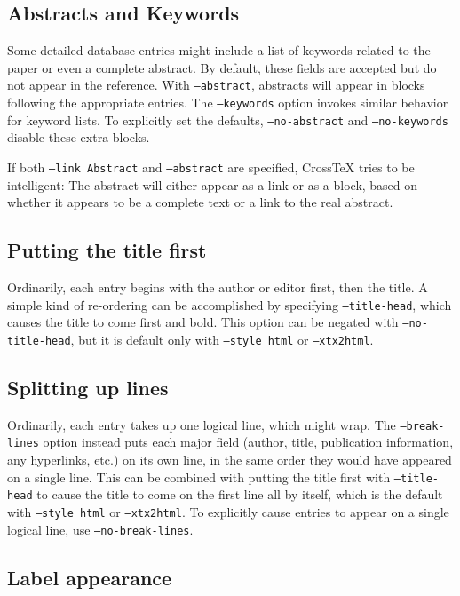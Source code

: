 \documentclass{article}
\newcommand{\XTX}{Cross\TeX}
\begin{document}
\subsection{Abstracts and Keywords}

Some detailed database entries might include a list of keywords related
to the paper or even a complete abstract.  By default, these fields are
accepted but do not appear in the reference.  With \texttt{--abstract},
abstracts will appear in blocks following the appropriate entries.
The \texttt{--keywords} option invokes similar behavior for keyword
lists.  To explicitly set the defaults, \texttt{--no-abstract} and
\texttt{--no-keywords} disable these extra blocks.

If both \texttt{--link~Abstract} and \texttt{--abstract} are specified,
\XTX{} tries to be intelligent: The abstract will either appear as a
link or as a block, based on whether it appears to be a complete text
or a link to the real abstract.

\subsection{Putting the title first}

Ordinarily, each entry begins with the author or editor first, then the
title.  A simple kind of re-ordering can be accomplished by specifying
\texttt{--title-head}, which causes the title to come first and bold.
This option can be negated with \texttt{--no-title-head}, but it is
default only with \texttt{--style~html} or \texttt{--xtx2html}.

\subsection{Splitting up lines}

Ordinarily, each entry takes up one logical line, which might wrap.
The \texttt{--break-lines} option instead puts each major field (author,
title, publication information, any hyperlinks, etc.) on its own line,
in the same order they would have appeared on a single line.  This can be
combined with putting the title first with \texttt{--title-head} to cause
the title to come on the first line all by itself, which is the default
with \texttt{--style~html} or \texttt{--xtx2html}.  To explicitly cause
entries to appear on a single logical line, use \texttt{--no-break-lines}.

\subsection{Label appearance}
\end{document}
